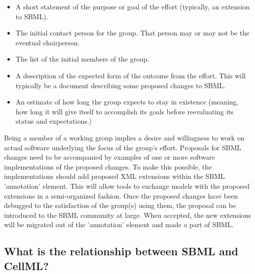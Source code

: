 \documentclass{sbmlfaq}
\begin{document}
\begin{itemize}
   \item A short statement of the purpose or goal of the effort
     (typically, an extension to SBML).

   \item The initial contact person for the group.  That person
     may or may not be the eventual chairperson.

   \item The list of the initial members of the group.

   \item A description of the expected form of the outcome from
     the effort.  This will typically be a document
     describing some proposed changes to SBML.

   \item An estimate of how long the group expects to stay in
     existence (meaning, how long it will give itself to
     accomplish its goals before reevaluating its status and
     expectations.)
\end{itemize}

Being a member of a working group implies a desire and
   willingness to work on actual software underlying the
   focus of the group's effort.  Proposals for SBML changes need
   to be accompanied by examples of one or more software
   implementations of the proposed changes.  To make this
   possible, the implementations should add proposed XML
   extensions within the SBML 'annotation' element.  This
   will allow tools to exchange models with the proposed
   extensions in a semi-organized fashion.  Once the
   proposed changes have been debugged to the satisfaction
   of the group(s) using them, the proposal can be
   introduced to the SBML community at large.  When
   accepted, the new extensions will be migrated out of the
   'annotation' element and made a part of SBML.


\subsection{What is the relationship between SBML and CellML?}
\end{document}

